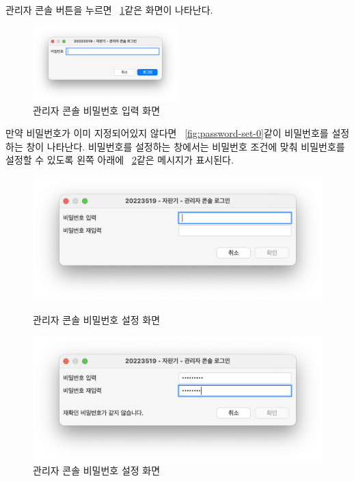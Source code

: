 \documentclass{oblivoir}
\newcommand{\figref}[1]{\figurename~\ref{#1}}
\begin{document}
    관리자 콘솔 버튼을 누르면 \figref{fig:password}\과 같은 화면이 나타난다.
    \begin{figure}[h]
        \centering
        \includegraphics[width=0.5\textwidth]{images/snapshot/password}
        \caption{관리자 콘솔 비밀번호 입력 화면}
        \label{fig:password}
    \end{figure}
    만약 비밀번호가 이미 지정되어있지 않다면 \figref{fig:password-set-0}\와 같이 비밀번호를 설정하는 창이 나타난다.
    비밀번호를 설정하는 창에서는 비밀번호 조건에 맞춰 비밀번호를 설정할 수 있도록 왼쪽 아래에 \figref{fig:password-set-1}\와 같은
    메시지가 표시된다.
    \begin{figure}[h]
        \centering
        \begin{minipage}{0.5\textwidth}
            \includegraphics[width=\textwidth]{images/snapshot/password-set-0}
            \caption{관리자 콘솔 비밀번호 설정 화면}
            \label{fig:password-set-0}
        \end{minipage}%
        \begin{minipage}{0.5\textwidth}
            \includegraphics[width=\textwidth]{images/snapshot/password-set-1}
            \caption{관리자 콘솔 비밀번호 설정 화면}
            \label{fig:password-set-1}
        \end{minipage}
    \end{figure}
\end{document}
